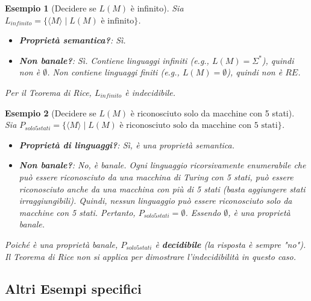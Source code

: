 \documentclass[a4paper]{article}
\newtheorem{example}{Esempio}
\begin{document}
\begin{example}[Decidere se $L(M)$ è infinito]
Sia $L_{infinito} = \{\langle M \rangle \mid L(M) \text{ è infinito}\}$.
\begin{itemize}
    \item \textbf{Proprietà semantica?}: Sì.
    \item \textbf{Non banale?}: Sì. Contiene linguaggi infiniti (e.g., $L(M)=\Sigma^*$), quindi non è $\emptyset$. Non contiene linguaggi finiti (e.g., $L(M)=\emptyset$), quindi non è $RE$.
\end{itemize}
Per il Teorema di Rice, $L_{infinito}$ è indecidibile.
\end{example}

\begin{example}[Decidere se $L(M)$ è riconosciuto solo da macchine con 5 stati]
Sia $P_{solo5stati} = \{\langle M \rangle \mid L(M) \text{ è riconosciuto solo da macchine con 5 stati}\}$.
\begin{itemize}
    \item \textbf{Proprietà di linguaggi?}: Sì, è una proprietà semantica.
    \item \textbf{Non banale?}: No, è banale. Ogni linguaggio ricorsivamente enumerabile che può essere riconosciuto da una macchina di Turing con 5 stati, può essere riconosciuto anche da una macchina con più di 5 stati (basta aggiungere stati irraggiungibili). Quindi, nessun linguaggio può essere riconosciuto \emph{solo} da macchine con 5 stati. Pertanto, $P_{solo5stati} = \emptyset$. Essendo $\emptyset$, è una proprietà banale.
\end{itemize}
Poiché è una proprietà banale, $P_{solo5stati}$ è \textbf{decidibile} (la risposta è sempre "no"). Il Teorema di Rice non si applica per dimostrare l'indecidibilità in questo caso.
\end{example}

\subsection{Altri Esempi specifici}
\end{document}
